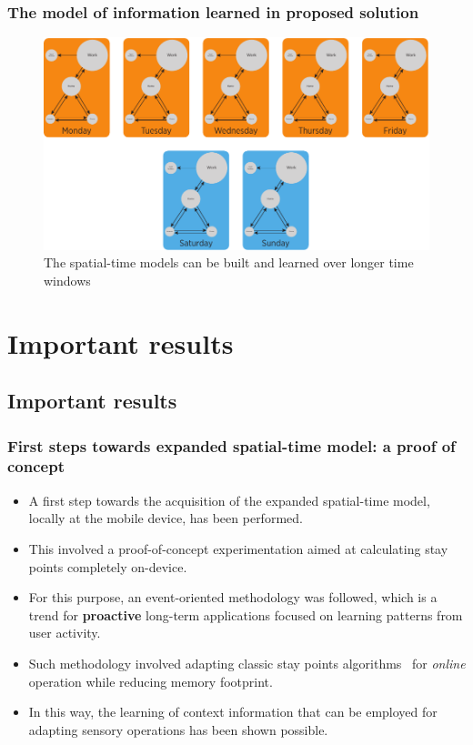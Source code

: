 \documentclass[compress,9pt,xcolor={dvipsnames,table}]{beamer}
\begin{document}
\begin{frame}[t]\frametitle{The model of information learned in proposed solution}
\begin{figure}[tb]
  \centering
  \includegraphics[width=\textwidth]{../../../resources/images/vectors/mobility-graph-larger-time-window-two-rows}
  \caption{The spatial-time models can be built and learned over longer time windows}
  \label{fig:information-learned-longer-time-windows}
\end{figure}
\end{frame}


\section{Important results}
\subsection{Important results}
\label{sub:important_results}
\begin{frame}[t]\frametitle{First steps towards expanded spatial-time model: a proof of concept}

\begin{itemize}
  \item A first step towards the acquisition of the expanded spatial-time model, locally at the mobile device, has been performed.
  \item This involved a proof-of-concept experimentation aimed at calculating stay points completely on-device.
  \item For this purpose, an event-oriented methodology was followed, which is a trend for \textbf{proactive} long-term applications focused on learning patterns from user activity.
  \item Such methodology involved adapting classic stay points algorithms~\cite{Montoliu2010,Zheng2011} for \emph{online} operation while reducing memory footprint.
  \item In this way, the learning of context information that can be employed for adapting sensory operations has been shown possible.  
\end{itemize}
\end{frame}
\end{document}
